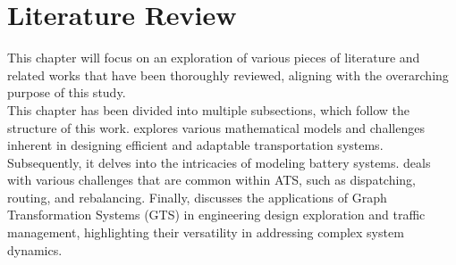 \chapter{Literature Review}\label{ch:related_work}
This chapter will focus on an exploration of various pieces of literature and related works that have been thoroughly reviewed, aligning with the overarching purpose of this study.\\
This chapter has been divided into multiple subsections, which follow the structure of this work.  explores various mathematical models and challenges inherent in designing efficient and adaptable transportation systems. Subsequently, it delves into the intricacies of modeling battery systems.  deals with various challenges that are common within ATS, such as dispatching, routing, and rebalancing. Finally,  discusses the applications of Graph Transformation Systems (GTS) in engineering design exploration and traffic management, highlighting their versatility in addressing complex system dynamics.


